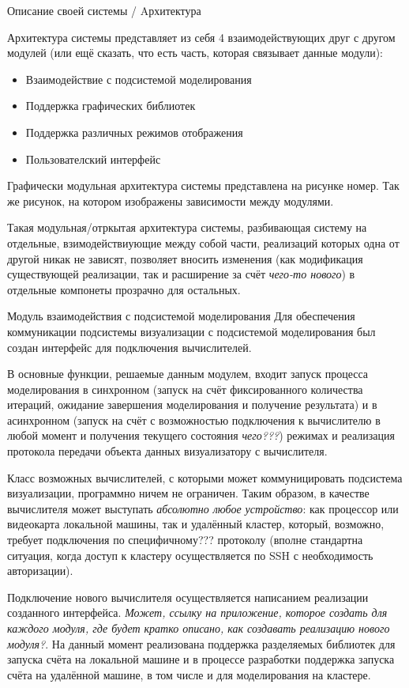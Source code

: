 \documentclass[a4paper,12pt]{extarticle}
\begin{document}
\begin{section}{Описание своей системы / Aрхитектура}

Архитектура системы представляет из себя 4 взаимодействующих друг с другом модулей (или ещё сказать, что есть часть, которая связывает данные модули):
\begin{itemize}
    \item Взаимодействие с подсистемой моделирования
    \item Поддержка графических библиотек
    \item Поддержка различных режимов отображения
    \item Пользователский интерфейс
\end{itemize}
Графически модульная архитектура системы представлена на рисунке номер. Так же рисунок, на котором изображены зависимости между модулями.

Такая модульная/отркытая архитектура системы, разбивающая систему на отдельные, взимодействиующие между собой части, реализаций которых одна от другой никак не зависят, позволяет вносить изменения (как модификация существующей реализации, так и расширение за счёт \textit{чего-то нового}) в отдельные компонеты прозрачно для остальных.

\begin{subsection}{Модуль взаимодействия с подсистемой моделирования}
    Для обеспечения коммуникации подсистемы визуализации с подсистемой моделирования был создан интерфейс для подключения вычислителей.

    В основные функции, решаемые данным модулем, входит запуск процесса моделирования в синхронном (запуск на счёт фиксированного количества итераций, ожидание завершения моделирования и получение результата) и в асинхронном (запуск на счёт с возможностью подключения к вычислителю в любой момент и получения текущего состояния \textit{чего???}) режимах и реализация протокола передачи объекта данных визуализатору с вычислителя.

    Класс возможных вычислителей, с которыми может коммуницировать подсистема визуализации, программно ничем не ограничен. Таким образом, в качестве вычислителя может выступать \textit{абсолютно любое устройство}: как процессор или видеокарта локальной машины, так и удалённый кластер, который, возможно, требует подключения по специфичному??? протоколу (вполне стандартна ситуация, когда доступ к кластеру осуществляется по SSH с необходимость авторизации).

    Подключение нового вычислителя осуществляется написанием реализации созданного интерфейса.
    \textit{Может, ссылку на приложение, которое создать для каждого модуля, где будет кратко описано, как создавать реализацию нового модуля?}. На данный момент реализована поддержка разделяемых библиотек для запуска счёта на локальной машине и в процессе разработки поддержка запуска счёта на удалённой машине, в том числе и для моделирования на кластере.


\end{subsection}
\end{section}
\end{document}
